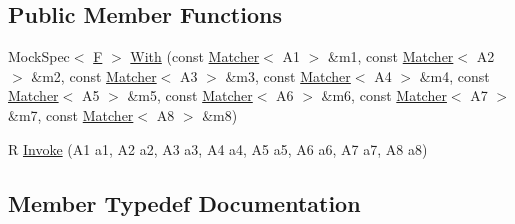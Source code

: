 \subsection*{Public Member Functions}
\begin{DoxyCompactItemize}
\item 
Mock\+Spec$<$ \mbox{\hyperlink{classtesting_1_1internal_1_1_function_mocker_3_01_r_07_a1_00_01_a2_00_01_a3_00_01_a4_00_01_a5_00_01_a6_00_01_a7_00_01_a8_08_4_ad9749c93b0a17540778c5fa162a5fe6c}{F}} $>$ \mbox{\hyperlink{classtesting_1_1internal_1_1_function_mocker_3_01_r_07_a1_00_01_a2_00_01_a3_00_01_a4_00_01_a5_00_01_a6_00_01_a7_00_01_a8_08_4_afaf6ae40f666819e2f02d383be6e3c4d}{With}} (const \mbox{\hyperlink{classtesting_1_1_matcher}{Matcher}}$<$ A1 $>$ \&m1, const \mbox{\hyperlink{classtesting_1_1_matcher}{Matcher}}$<$ A2 $>$ \&m2, const \mbox{\hyperlink{classtesting_1_1_matcher}{Matcher}}$<$ A3 $>$ \&m3, const \mbox{\hyperlink{classtesting_1_1_matcher}{Matcher}}$<$ A4 $>$ \&m4, const \mbox{\hyperlink{classtesting_1_1_matcher}{Matcher}}$<$ A5 $>$ \&m5, const \mbox{\hyperlink{classtesting_1_1_matcher}{Matcher}}$<$ A6 $>$ \&m6, const \mbox{\hyperlink{classtesting_1_1_matcher}{Matcher}}$<$ A7 $>$ \&m7, const \mbox{\hyperlink{classtesting_1_1_matcher}{Matcher}}$<$ A8 $>$ \&m8)
\item 
R \mbox{\hyperlink{classtesting_1_1internal_1_1_function_mocker_3_01_r_07_a1_00_01_a2_00_01_a3_00_01_a4_00_01_a5_00_01_a6_00_01_a7_00_01_a8_08_4_aff60c590ad791fa2a34751fe5a1e51c2}{Invoke}} (A1 a1, A2 a2, A3 a3, A4 a4, A5 a5, A6 a6, A7 a7, A8 a8)
\end{DoxyCompactItemize}


\subsection{Member Typedef Documentation}
\mbox{\label{classtesting_1_1internal_1_1_function_mocker_3_01_r_07_a1_00_01_a2_00_01_a3_00_01_a4_00_01_a5_00_01_a6_00_01_a7_00_01_a8_08_4_a57bc2be00815deac8964e2d2ae62fdd2}} 
